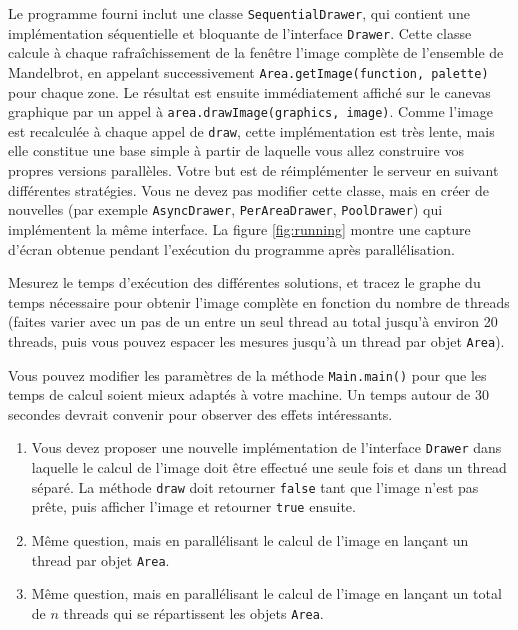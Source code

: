 \documentclass{td}
\begin{document}
Le programme fourni inclut une classe \lstinline{SequentialDrawer}, qui contient une implémentation
séquentielle et bloquante de l'interface \lstinline{Drawer}.
Cette classe calcule à chaque rafraîchissement de la fenêtre l'image complète de l'ensemble de Mandelbrot,
en appelant successivement \lstinline{Area.getImage(function, palette)} pour chaque zone.
Le résultat est ensuite immédiatement affiché sur le canevas graphique par un appel
à \lstinline{area.drawImage(graphics, image)}.
Comme l'image est recalculée à chaque appel de \lstinline{draw}, cette implémentation est très lente,
mais elle constitue une base simple à partir de laquelle vous allez construire vos propres versions parallèles.
Votre but est de réimplémenter le serveur en suivant différentes stratégies.
Vous ne devez pas modifier cette classe, mais en créer de nouvelles
(par exemple \lstinline{AsyncDrawer}, \lstinline{PerAreaDrawer}, \lstinline{PoolDrawer}) qui implémentent la même interface.
La figure \ref{fig:running} montre une capture d'écran obtenue pendant l'exécution du programme après parallélisation.

Mesurez le temps d'exécution des différentes solutions, et tracez le graphe du temps nécessaire pour obtenir l'image complète en
fonction du nombre de threads (faites varier avec un pas de un entre un seul thread au total
jusqu'à environ 20 threads, puis vous pouvez espacer les mesures jusqu'à un thread par objet \lstinline{Area}).

Vous pouvez modifier les paramètres de la méthode \lstinline{Main.main()}
pour que les temps de calcul soient mieux adaptés à votre machine. Un temps autour de
30 secondes devrait convenir pour observer des effets intéressants.

\begin{enumerate}
\item Vous devez proposer une nouvelle implémentation de l'interface \lstinline{Drawer}
  dans laquelle le calcul de l'image doit être effectué une seule fois et dans un thread séparé.
  La méthode \lstinline{draw} doit retourner \lstinline{false} tant que l'image n'est pas prête,
  puis afficher l'image et retourner \lstinline{true} ensuite.

\item Même question, mais en parallélisant le calcul de l'image en lançant un thread par objet \lstinline{Area}.

\item Même question, mais en parallélisant le calcul de l'image en lançant un total de $n$ threads qui se répartissent les objets \lstinline{Area}.
\end{enumerate}
\end{document}
